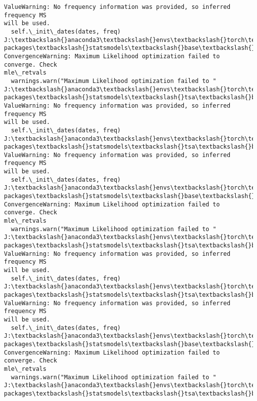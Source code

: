 \documentclass[11pt]{article}
\begin{document}
\begin{Verbatim}[commandchars=\\\{\}]
ValueWarning: No frequency information was provided, so inferred frequency MS
will be used.
  self.\_init\_dates(dates, freq)
J:\textbackslash{}anaconda3\textbackslash{}envs\textbackslash{}torch\textbackslash{}Lib\textbackslash{}site-packages\textbackslash{}statsmodels\textbackslash{}base\textbackslash{}model.py:607:
ConvergenceWarning: Maximum Likelihood optimization failed to converge. Check
mle\_retvals
  warnings.warn("Maximum Likelihood optimization failed to "
J:\textbackslash{}anaconda3\textbackslash{}envs\textbackslash{}torch\textbackslash{}Lib\textbackslash{}site-packages\textbackslash{}statsmodels\textbackslash{}tsa\textbackslash{}base\textbackslash{}tsa\_model.py:473:
ValueWarning: No frequency information was provided, so inferred frequency MS
will be used.
  self.\_init\_dates(dates, freq)
J:\textbackslash{}anaconda3\textbackslash{}envs\textbackslash{}torch\textbackslash{}Lib\textbackslash{}site-packages\textbackslash{}statsmodels\textbackslash{}tsa\textbackslash{}base\textbackslash{}tsa\_model.py:473:
ValueWarning: No frequency information was provided, so inferred frequency MS
will be used.
  self.\_init\_dates(dates, freq)
J:\textbackslash{}anaconda3\textbackslash{}envs\textbackslash{}torch\textbackslash{}Lib\textbackslash{}site-packages\textbackslash{}statsmodels\textbackslash{}base\textbackslash{}model.py:607:
ConvergenceWarning: Maximum Likelihood optimization failed to converge. Check
mle\_retvals
  warnings.warn("Maximum Likelihood optimization failed to "
J:\textbackslash{}anaconda3\textbackslash{}envs\textbackslash{}torch\textbackslash{}Lib\textbackslash{}site-packages\textbackslash{}statsmodels\textbackslash{}tsa\textbackslash{}base\textbackslash{}tsa\_model.py:473:
ValueWarning: No frequency information was provided, so inferred frequency MS
will be used.
  self.\_init\_dates(dates, freq)
J:\textbackslash{}anaconda3\textbackslash{}envs\textbackslash{}torch\textbackslash{}Lib\textbackslash{}site-packages\textbackslash{}statsmodels\textbackslash{}tsa\textbackslash{}base\textbackslash{}tsa\_model.py:473:
ValueWarning: No frequency information was provided, so inferred frequency MS
will be used.
  self.\_init\_dates(dates, freq)
J:\textbackslash{}anaconda3\textbackslash{}envs\textbackslash{}torch\textbackslash{}Lib\textbackslash{}site-packages\textbackslash{}statsmodels\textbackslash{}base\textbackslash{}model.py:607:
ConvergenceWarning: Maximum Likelihood optimization failed to converge. Check
mle\_retvals
  warnings.warn("Maximum Likelihood optimization failed to "
J:\textbackslash{}anaconda3\textbackslash{}envs\textbackslash{}torch\textbackslash{}Lib\textbackslash{}site-packages\textbackslash{}statsmodels\textbackslash{}tsa\textbackslash{}base\textbackslash{}tsa\_model.py:473:

\end{Verbatim}
\end{document}
